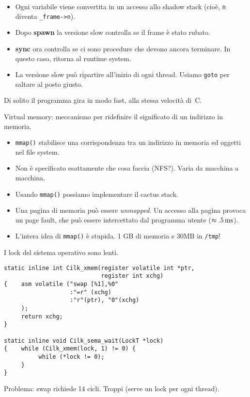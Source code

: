 \documentclass[times,sans-serif]{athenaslides}
\newcommand{\cilkkw}[1]{{\bf #1}}
\begin{document}
%
%
\begin{slide}
  \smallskip
  \begin{itemize}
  \item Ogni variabile viene convertita in un accesso allo shadow stack
    (cio\`e, \texttt{n} diventa \texttt{\_frame->n}).
  \item Dopo \cilkkw{spawn} la versione slow controlla se il frame
    \`e stato rubato.
  \item \cilkkw{sync} ora controlla se ci sono procedure che devono
    ancora terminare. In questo caso, ritorna al runtime system.
  \item La versione slow pu\`o ripartire all'inizio di ogni thread.
    Usiamo \texttt{goto} per saltare al posto giusto.
  \end{itemize}
  \medskip
  \begin{Red}
    Di solito il programma gira in modo fast, alla stessa velocit\`a
    di~C.
  \end{Red}
\end{slide}
\begin{slide}
  \begin{Red}
    Virtual memory: meccanismo per ridefinire il significato
    di un indirizzo in memoria.
  \end{Red}

  \begin{itemize}
  \item {\tt mmap()} stabilisce una corrispondenza tra un indirizzo
    in memoria ed oggetti nel file system.
  \item Non \`e specificato esattamente che cosa faccia (NFS?).
    Varia da macchina a macchina.
  \item Usando {\tt mmap()} possiamo implementare il cactus stack.
  \item Una pagina di memoria pu\`o essere \emph{unmapped}.  Un
    accesso alla pagina provoca un page fault, che pu\`o essere
    intercettato dal programma utente ($\approx .5\, \rm ms$).
  \item L'intera idea di {\tt mmap()} \`e stupida. 1 GB di memoria
    e 30MB in {\tt /tmp}!
  \end{itemize}
\end{slide}
\begin{slide}[Lock]
\smaller
  \begin{Red}
    I lock del sistema operativo sono lenti.
  \end{Red}
\begin{verbatim}
static inline int Cilk_xmem(register volatile int *ptr, 
                            register int xchg)
{    asm volatile ("swap [%1],%0"
                   :"=r" (xchg)
                   :"r"(ptr), "0"(xchg)
     );
     return xchg;
}

static inline void Cilk_sema_wait(LockT *lock)
{    while (Cilk_xmem(lock, 1) != 0) {
          while (*lock != 0);
     }
}
\end{verbatim}

  Problema: swap richiede 14 cicli.  Troppi (serve un lock per ogni
  thread).
\end{slide}
\end{document}
